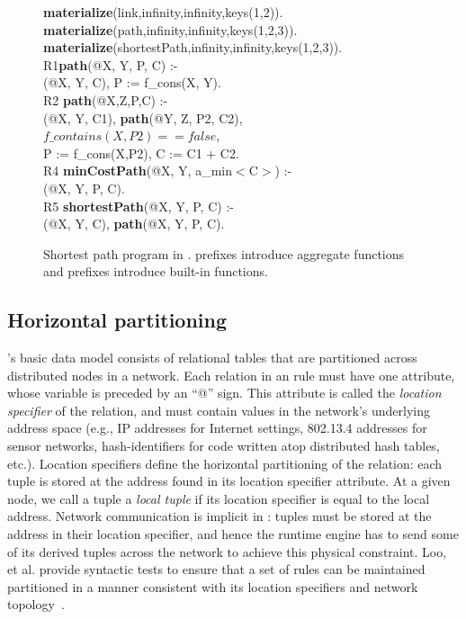 \begin{figure}
\ssp
\begin{boxedminipage}{\linewidth}
{\bf materialize}(link,infinity,infinity,keys(1,2)). \\
{\bf materialize}(path,infinity,infinity,keys(1,2,3)).  \\
{\bf materialize}(shortestPath,infinity,infinity,keys(1,2,3)). \\

R1{\bf path}(@X, Y, P, C) :- \\
(@X, Y, C), P := f\_cons(X, Y). \\

R2 {\bf path}(@X,Z,P,C) :- \\
(@X, Y, C1), {\bf path}(@Y, Z, P2, C2), \\
\datalogspace $f\_contains(X,P2) == false$, \\
\datalogspace P := f\_cons(X,P2), C := C1 + C2. \\ 

R4 {\bf minCostPath}(@X, Y, a\_min$<$C$>$) :-  \\
(@X, Y, P, C). \\

R5 {\bf shortestPath}(@X, Y, P, C) :- \\
(@X, Y, C), {\bf path}(@X, Y, P, C).\\
\end{boxedminipage}
\caption{\label{ch:p2:fig:overlogSP}Shortest path program in \OVERLOG. 
prefixes introduce aggregate functions and  prefixes introduce
built-in functions.}
\end{figure}

\subsection{Horizontal partitioning}

\OVERLOG's basic data model consists of relational tables that are partitioned
across distributed nodes in a network.  Each relation in an \OVERLOG rule must
have one attribute, whose variable is preceded by an ``@'' sign.  This
attribute is called the {\em location specifier} of the relation, and must
contain values in the network's underlying address space (e.g., IP addresses
for Internet settings, 802.13.4 addresses for sensor networks, hash-identifiers
for code written atop distributed hash tables, etc.).  Location specifiers
define the horizontal partitioning of the relation: each tuple is stored at the
address found in its location specifier attribute.  At a given node, we call a
tuple a {\em local tuple} if its location specifier is equal to the local
address.  Network communication is implicit in \OVERLOG: tuples must be stored
at the address in their location specifier, and hence the runtime engine has to
send some of its derived tuples across the network to achieve this physical
constraint.  Loo, et al.  provide syntactic tests to ensure that a set of rules
can be maintained partitioned in a manner consistent with its location
specifiers and network topology~\cite{loo-sigmod06}.


